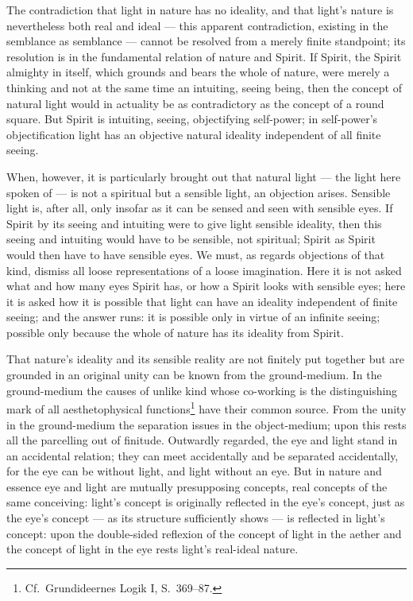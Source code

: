 \documentclass[12pt,a4paper]{book}
\begin{document}
The contradiction that light in nature has no ideality, and that light's nature is nevertheless both real and ideal ---
this apparent contradiction, existing in the semblance as semblance --- cannot be resolved from a merely finite
standpoint; its resolution is in the fundamental relation of nature and Spirit. If Spirit, the Spirit almighty in
itself, which grounds and bears the whole of nature, were merely a thinking and not at the same time an intuiting,
seeing being, then the concept of natural light would in actuality be as contradictory as the concept of a round square.
But Spirit is intuiting, seeing, objectifying self-power; in self-power's objectification light has an objective natural
ideality independent of all finite seeing.

When, however, it is particularly brought out that natural light --- the light here spoken of --- is not a spiritual but
a sensible light, an objection arises. Sensible light is, after all, only insofar as it can be sensed and seen with
sensible eyes. If Spirit by its seeing and intuiting were to give light sensible ideality, then this seeing and
intuiting would have to be sensible, not spiritual; Spirit as Spirit would then have to have sensible eyes. We must, as
regards objections of that kind, dismiss all loose representations of a loose imagination. Here it is not asked what and
how many eyes Spirit has, or how a Spirit looks with sensible eyes; here it is asked how it is possible
that light can have an ideality independent of finite seeing; and the answer runs: it is possible only in virtue of an
infinite seeing; possible only because the whole of nature has its ideality from Spirit.

That nature's ideality and its sensible reality are not finitely put together but are grounded in an original unity can
be known from the ground-medium. In the ground-medium the causes of unlike kind whose co-working is the distinguishing
mark of all aesthetophysical functions\footnote{Cf.\ Grundideernes Logik I, S.\ 369--87.} have their common source. From
the unity in the ground-medium the separation issues in the object-medium; upon this rests all the parcelling out of
finitude. Outwardly regarded, the eye and light stand in an accidental relation; they can meet accidentally and be
separated accidentally, for the eye can be without light, and light without an eye. But in nature and essence eye and
light are mutually presupposing concepts, real concepts of the same conceiving: light's concept is originally reflected
in the eye's concept, just as the eye's concept --- as its structure sufficiently shows --- is reflected in light's
concept: upon the double-sided reflexion of the concept of light in the aether and the concept of light in the eye rests
light's real-ideal nature.
\end{document}
